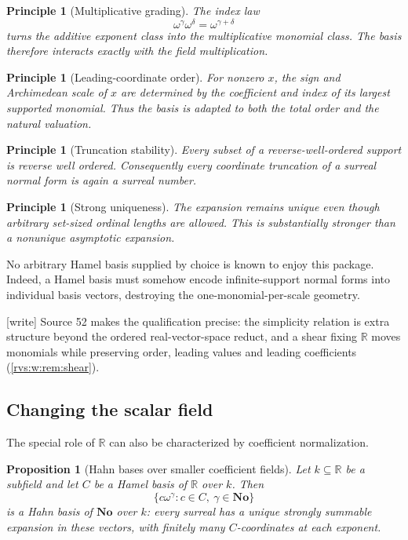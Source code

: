 \documentclass[11pt,letterpaper]{article}
\numberwithin{equation}{section}
\newtheorem{proposition}[theorem]{Proposition}
\newtheorem{principle}[theorem]{Principle}
\theoremstyle{definition}
\theoremstyle{remark}
\newcommand{\No}{\mathbf{No}}
\newcommand{\R}{\mathbb{R}}
\newcommand{\wtag}{\textup{[write]}}%
\begin{document}
\begin{principle}[Multiplicative grading]
The index law
\[
 \omega^\gamma\omega^\delta=\omega^{\gamma+\delta}
\]
turns the additive exponent class into the multiplicative monomial class.
The basis therefore interacts exactly with the field multiplication.
\end{principle}

\begin{principle}[Leading-coordinate order]
For nonzero \(x\), the sign and Archimedean scale of \(x\) are determined by
the coefficient and index of its largest supported monomial.  Thus the basis
is adapted to both the total order and the natural valuation.
\end{principle}

\begin{principle}[Truncation stability]
Every subset of a reverse-well-ordered support is reverse well ordered.
Consequently every coordinate truncation of a surreal normal form is again a
surreal number.
\end{principle}

\begin{principle}[Strong uniqueness]
The expansion remains unique even though arbitrary set-sized ordinal lengths
are allowed.  This is substantially stronger than a nonunique asymptotic
expansion.
\end{principle}

No arbitrary Hamel basis supplied by choice is known to enjoy this package.
Indeed, a Hamel basis must somehow encode infinite-support normal forms into
individual basis vectors, destroying the one-monomial-per-scale geometry.

\noindent\wtag{} Source 52 makes the qualification precise: the simplicity
relation is extra structure beyond the ordered real-vector-space reduct, and
a shear fixing \(\R\) moves monomials while preserving order, leading values
and leading coefficients (\cref{rvs:w:rem:shear}).

\subsection{Changing the scalar field}\label{rvs:subsec:scalar-change}

The special role of \(\R\) can also be characterized by coefficient
normalization.

\begin{proposition}[Hahn bases over smaller coefficient fields]
Let \(k\subseteq\R\) be a subfield and let \(C\) be a Hamel basis of \(\R\)
over \(k\).  Then
\begin{equation}\label{rvs:eq:k-hahn-basis}
  \{c\omega^\gamma:c\in C,\ \gamma\in\No\}
\end{equation}
is a Hahn basis of \(\No\) over \(k\): every surreal has a unique strongly
summable expansion in these vectors, with finitely many \(C\)-coordinates at
each exponent.
\end{proposition}
\end{document}
